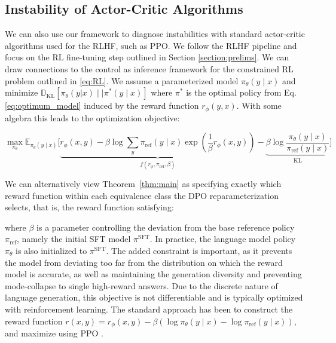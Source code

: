 \subsection{Instability of Actor-Critic Algorithms} We can also use our framework to diagnose instabilities with standard actor-critic algorithms used for the RLHF, such as PPO. We follow the RLHF pipeline and focus on the RL fine-tuning step outlined in Section \ref{section:prelims}. We can draw connections to the control as inference framework \cite{levine2018reinforcement} for the constrained RL problem outlined in \ref{eq:RL}. We assume a parameterized model $\pi_{\theta}(y\mid x)$ and minimize $\mathbb{D}_{\text{KL}}[\pi_{\theta}(y|x) \mid \mid \pi^*(y\mid x)]$ where $\pi^*$ is the optimal policy from Eq. \ref{eq:optimum_model} induced by the reward function $r_{\phi}(y, x)$. With some algebra this leads to the optimization objective:

\begin{equation}\label{eq:AC}
    \max_{\pi_{\theta}}\mathbb{E}_{\pi_{\theta}(y\mid x)}\bigg[\underbrace{r_{\phi}(x, y) -\beta\log\sum_{y}\pi_\text{ref}(y\mid x)\exp\left(\frac{1}{\beta}r_{\phi}(x, y)\right)}_{f(r_{\phi}, \pi_\text{ref}, \beta)} - \underbrace{\beta\log\frac{\pi_{\theta}(y\mid x)}{\pi_\text{ref}(y\mid x)}}_{\text{KL}}\bigg]
\end{equation}



We can alternatively view Theorem~\ref{thm:main} as specifying exactly which reward function within each equivalence class the DPO reparameterization selects, that is, the reward function satisfying:

where $\beta$ is a parameter controlling the deviation from the base reference policy $\pi_\text{ref}$, namely the initial SFT model $\pi^\text{SFT}$. 
In practice, the language model policy $\pi_\theta$ is also initialized to $\pi^\text{SFT}$. The added constraint is important, as it prevents the model from deviating too far from the distribution on which the reward model is accurate, as well as maintaining the generation diversity and preventing mode-collapse to single high-reward answers. Due to the discrete nature of language generation, this objective is not differentiable and is typically optimized with reinforcement learning. The standard approach \citep{ziegler2020finetuning, stiennon2022learning, bai2022training, ouyang2022training} has been to construct the reward function ${r(x, y) = r_{\phi}(x, y) -\beta (\log \pi_{\theta}(y\mid x) - \log \pi_\text{ref}(y\mid x))}$, and maximize using PPO \cite{schulman2017proximal}. 


